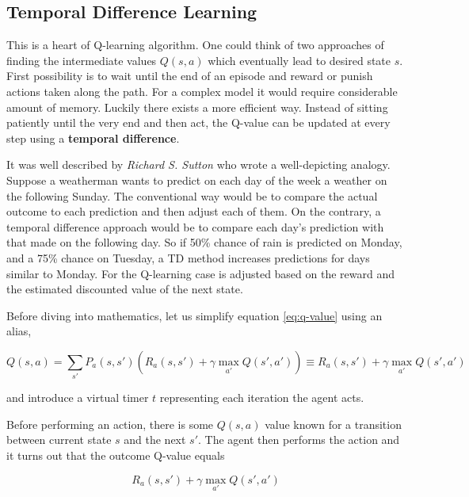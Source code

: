 \subsection{Temporal Difference Learning}
\label{sub:temporal-difference-learning}

This is a heart of Q-learning algorithm. One could think of two approaches of finding the intermediate values $Q(s, a)$ which eventually lead to desired state $s$. First possibility is to wait until the end of an episode and reward or punish actions taken along the path. For a complex model it would require considerable amount of memory. Luckily there exists a more efficient way. Instead of sitting patiently until the very end and then act, the Q-value can be updated at every step using a \textbf{temporal difference}.

It was well described by \emph {Richard S. Sutton} \cite{SuttonTD} who wrote a well-depicting analogy. Suppose a weatherman wants to predict on each day of the week a weather on the following Sunday. The conventional way would be to compare the actual outcome to each prediction and then adjust each of them. On the contrary, a temporal difference approach would be to compare each day's prediction with that made on the following day. So if 50\% chance of rain is predicted on Monday, and a 75\% chance on Tuesday, a TD method increases predictions for days similar to Monday. For the Q-learning case is adjusted based on the reward and the estimated discounted value of the next state.

Before diving into mathematics, let us simplify equation \ref{eq:q-value} using an alias,

\begin{equation}
    Q(s, a) = \sum_{s'} P_a(s, s') \left(R_a(s, s') + \gamma \max_{a'} Q(s', a') \right)
    \equiv
    R_a(s, s') + \gamma \max_{a'} Q(s', a')
\label{eq:q-learn-alias}
\end{equation}

and introduce a virtual timer $t$ representing each iteration the agent acts.

Before performing an action, there is some $Q(s, a)$ value known for a transition between current state $s$ and the next $s'$. The agent then performs the action and it turns out that the outcome Q-value equals 

\begin{equation}
    R_a(s, s') + \gamma \max_{a'} Q(s', a')
\end{equation}

